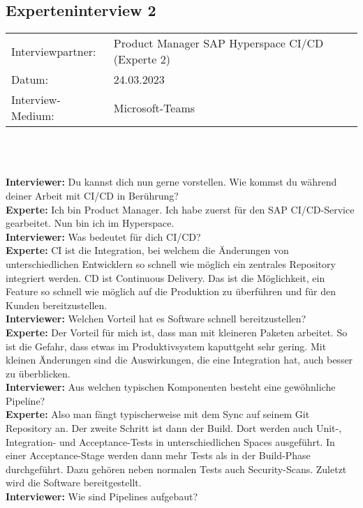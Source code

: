 \subsection{Experteninterview 2}
	\begin{tabular}{ l l }
		Interviewpartner: & Product Manager SAP Hyperspace CI/CD (Experte 2)\\
		Datum: & 24.03.2023\\
		Interview-Medium: & Microsoft-Teams\\
\end{tabular}\\\\
\begin{linenumbers}
    \textbf{Interviewer:} Du kannst dich nun gerne vorstellen. Wie kommst du während deiner Arbeit mit CI/CD in Berührung?\\
    \textbf{Experte:} Ich bin Product Manager. Ich habe zuerst für den SAP CI/CD-Service gearbeitet. Nun bin ich im Hyperspace.\\
    \textbf{Interviewer:} Was bedeutet für dich CI/CD?\\
    \textbf{Experte:} CI ist die Integration, bei welchem die Änderungen von unterschiedlichen Entwicklern so schnell wie möglich ein zentrales Repository integriert werden. CD ist Continuous Delivery. Das ist die Möglichkeit, ein Feature so schnell wie möglich auf die Produktion zu überführen und für den Kunden bereitzustellen.\\
    \textbf{Interviewer:} Welchen Vorteil hat es Software schnell bereitzustellen?\\
    \textbf{Experte:} Der Vorteil für mich ist, dass man mit kleineren Paketen arbeitet. So ist die Gefahr, dass etwas im Produktivsystem kaputtgeht sehr gering. Mit kleinen Änderungen sind die Auswirkungen, die eine Integration hat, auch besser zu überblicken.\\
    \textbf{Interviewer:} Aus welchen typischen Komponenten besteht eine gewöhnliche Pipeline?\\
    \textbf{Experte:} Also man fängt typischerweise mit dem Sync auf seinem Git Repository an. Der zweite Schritt ist dann der Build. Dort werden auch Unit-, Integration- und Acceptance-Tests in unterschiedlichen Spaces ausgeführt. In einer Acceptance-Stage werden dann mehr Tests als in der Build-Phase durchgeführt. Dazu gehören neben normalen Tests auch Security-Scans. Zuletzt wird die Software bereitgestellt.\\
    \textbf{Interviewer:} Wie sind Pipelines aufgebaut?\\

\end{linenumbers}
